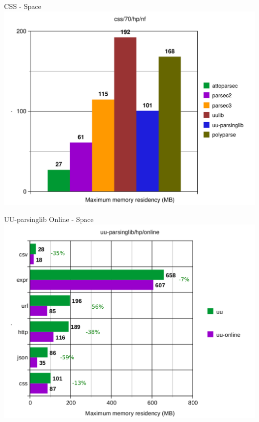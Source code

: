\documentclass{beamer}
\begin{document}
\begin{frame}{CSS - Space}
\includegraphics[scale=0.5]{presentation/css-70-hp-nf.pdf}
\end{frame}

\begin{frame}{UU-parsinglib Online - Space}
\includegraphics[scale=0.5]{presentation/uu-parsinglib-hp-online_.pdf}
\end{frame}
\end{document}
